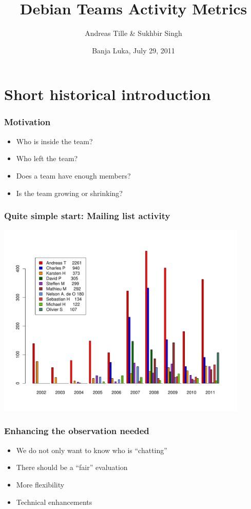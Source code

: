 \documentclass[compress]{beamer}
\title{Debian Teams Activity Metrics}
\author{Andreas Tille \& Sukhbir Singh}
\institute{\link{http://www.debconf.org/debconf11/}{DebConf 11}}
\date{Banja Luka, July 29, 2011}
\begin{document}
\begin{frame}
  \titlepage
\end{frame}

\section{Short historical introduction}

\begin{frame}
  \frametitle{Motivation}
  \begin{itemize}
     \item Who is inside the team?
     \item Who left the team?
     \item Does a team have enough members?
     \item Is the team growing or shrinking?
  \end{itemize}
\end{frame}

\begin{frame}
  \frametitle{Quite simple start: Mailing list activity}
      \begin{center}
        \includegraphics[width=0.9\textwidth]{authorstat_med}
      \end{center}
\end{frame}

\begin{frame}
  \frametitle{Enhancing the observation needed}
  \begin{itemize}
    \item We do not only want to know who is ``chatting''
    \item There should be a ``fair'' evaluation
    \item More flexibility
    \item Technical enhancements
  \end{itemize}
\end{frame}
\end{document}
